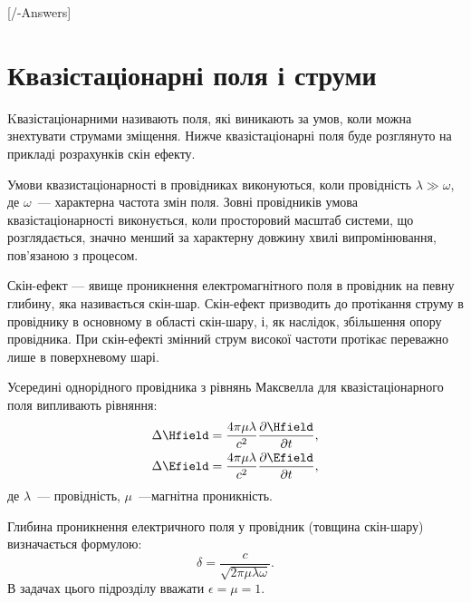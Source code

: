 
[\currfilebase/\currfilebase-Answers]
\chapter{Квазістаціонарні поля і струми}\label{\currfilebase}

\begin{Theory}
	Kвазістаціонарними називають поля, які виникають за умов, коли можна знехтувати струмами зміщення. Нижче квазістаціонарні поля буде розглянуто на прикладі розрахунків скін ефекту.

	Умови квазистаціонарності в провідниках виконуються, коли провідність  $\lambda \gg \omega$, де $\omega$~--- характерна частота змін поля. Зовні провідників умова  квазістаціонарності  виконується, коли просторовий масштаб системи, що розглядається, значно менший за характерну довжину хвилі випромінювання, пов'язаною з процесом.

	Скін-ефект --- явище проникнення електромагнітного поля в провідник на певну глибину, яка називається скін-шар. Скін-ефект призводить до протікання струму в провіднику в основному в області скін-шару, і, як наслідок, збільшення опору провідника. При скін-ефекті змінний струм високої частоти протікає переважно лише в поверхневому шарі.

	Усередині однорідного провідника з рівнянь Максвелла для квазістаціонарного поля випливають рівняння:
	\begin{equation}
		\begin{aligned}\label{eq:skin-effect}
			\Delta \Hfield & = \frac{4\pi\mu\lambda}{c^2}\frac{\partial\Hfield}{\partial t},  \\
			\Delta \Efield & = \frac{4\pi\mu\lambda}{c^2}\frac{\partial\Efield}{\partial t} ,
		\end{aligned}
	\end{equation}
	де $\lambda$~--- провідність,  $\mu$~---магнітна проникність.

	Глибина проникнення електричного поля у провідник (товщина скін-шару) визначається формулою:
	\begin{equation}\label{eq:skin-thickness}
		\delta = \frac{c}{\sqrt{2\pi\mu\lambda\omega}}.
	\end{equation}
    В задачах цього підрозділу вважати $\epsilon=\mu=1$.
\end{Theory}

